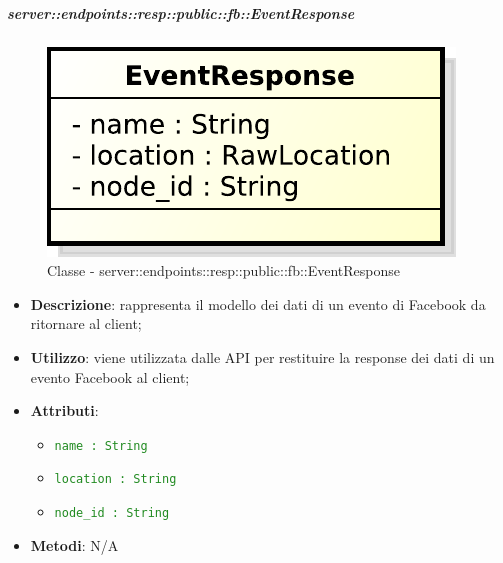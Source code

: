     \subparagraph{server::endpoints::resp::public::fb::EventResponse} %
    \label{subp:bdsm_app_server_endpoints_resp_public_fb_eventresponse}
  \begin{figure}[!htbp]
    \centering
    \centerline{\includegraphics[scale=0.6]{./images/server/classes/endpoints/fb/event_response.pdf}}
    \caption{Classe - server::endpoints::resp::public::fb::EventResponse}
  \end{figure}
    \begin{itemize}
      \item \textbf{Descrizione}: rappresenta il modello dei dati di un evento di Facebook da ritornare al client;
      \item \textbf{Utilizzo}: viene utilizzata dalle API per restituire la response dei dati di un evento Facebook al client;

    \item \textbf{Attributi}:
      \begin{itemize}
        \item \textcolor{forestgreen}{\texttt{name : String}}
        \item \textcolor{forestgreen}{\texttt{location : String}}
        \item \textcolor{forestgreen}{\texttt{node\_id : String}}
      \end{itemize}
    \item \textbf{Metodi}: N/A
      \end{itemize}

